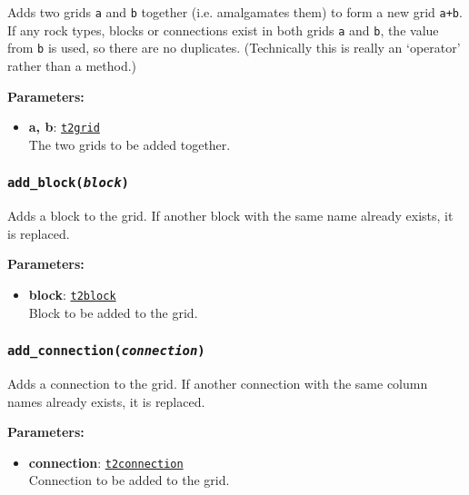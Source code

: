 Adds two grids \texttt{a} and \texttt{b} together (i.e. amalgamates them) to form a new grid \texttt{a+b}.  If any rock types, blocks or connections exist in both grids \texttt{a} and \texttt{b}, the value from \texttt{b} is used, so there are no duplicates.  (Technically this is really an `operator' rather than a method.)

\textbf{Parameters:}
\begin{itemize}
\item \textbf{a, b}: \hyperref[t2grids]{\texttt{t2grid}}\\
  The two grids to be added together.
\end{itemize}

\begin{snugshade}
\subsubsection{\texttt{add\_block(\emph{block})}}
\end{snugshade}
\label{sec:t2grid:add_block}

Adds a block to the grid.  If another block with the same name already exists, it is replaced.

\textbf{Parameters:}
\begin{itemize}
\item \textbf{block}: \hyperref[t2blockobjects]{\texttt{t2block}}\\
  Block to be added to the grid.
\end{itemize}

\begin{snugshade}
\subsubsection{\texttt{add\_connection(\emph{connection})}}
\end{snugshade}
\label{sec:t2grid:add_connection}

Adds a connection to the grid.  If another connection with the same column names already exists, it is replaced.

\textbf{Parameters:}
\begin{itemize}
\item \textbf{connection}: \hyperref[t2connectionobjects]{\texttt{t2connection}}\\
  Connection to be added to the grid.
\end{itemize}

